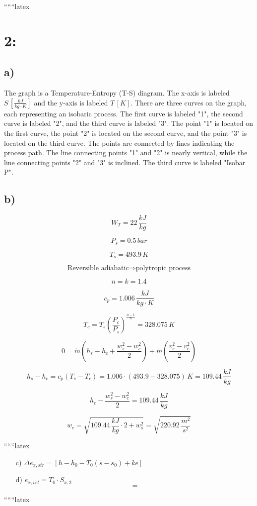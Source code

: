 
``````latex


\section*{2:}

\subsection*{a)}

The graph is a Temperature-Entropy (T-S) diagram. The x-axis is labeled \( S \, [\frac{kJ}{kg \cdot K}] \) and the y-axis is labeled \( T \, [K] \). There are three curves on the graph, each representing an isobaric process. The first curve is labeled "1", the second curve is labeled "2", and the third curve is labeled "3". The point "1" is located on the first curve, the point "2" is located on the second curve, and the point "3" is located on the third curve. The points are connected by lines indicating the process path. The line connecting points "1" and "2" is nearly vertical, while the line connecting points "2" and "3" is inclined. The third curve is labeled "Isobar P".

\subsection*{b)}

\[
W_T = 22 \, \frac{kJ}{kg}
\]

\[
P_s = 0.5 \, bar
\]

\[
T_s = 493.9 \, K
\]

\[
\text{Reversible adiabatic} \Rightarrow \text{polytropic process}
\]

\[
n = k = 1.4
\]

\[
c_p = 1.006 \, \frac{kJ}{kg \cdot K}
\]

\[
T_c = T_s \left( \frac{P_c}{P_s} \right)^{\frac{n-1}{n}} = 328.075 \, K
\]

\[
0 = \dot{m} \left( h_s - h_c + \frac{w_s^2 - w_c^2}{2} \right) + \dot{m} \left( \frac{v_s^2 - v_c^2}{2} \right)
\]

\[
h_s - h_c = c_p (T_s - T_c) = 1.006 \cdot (493.9 - 328.075) \, K = 109.44 \, \frac{kJ}{kg}
\]

\[
h_c - \frac{w_s^2 - w_c^2}{2} = 109.44 \, \frac{kJ}{kg}
\]

\[
w_c = \sqrt{109.44 \, \frac{kJ}{kg} \cdot 2 + w_s^2} = \sqrt{220.92 \, \frac{m^2}{s^2}}
\]

``````latex


\begin{itemize}
    \item[c)] \(\Delta e_{x,str} = \left[ h - h_0 - T_0 (s - s_0) + ke \right]\)
    \item[d)] \(e_{x,vel} = T_0 \cdot \dot{S}_{x,2}\)
    \[
    =
    \]
\end{itemize}

``````latex


